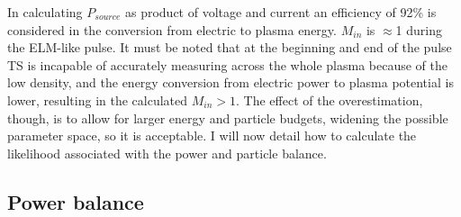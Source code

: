 In calculating $P_{source}$ as product of voltage and current an efficiency of 92\% is considered in the conversion from electric to plasma energy.\cite{Morgan2014} $M_{in}$ is $\approx$1 during the ELM-like pulse. It must be noted that at the beginning and end of the pulse TS is incapable of accurately measuring across the whole plasma because of the low density, and the energy conversion from electric power to plasma potential is lower, resulting in the calculated $M_{in}>1$. The effect of the overestimation, though, is to allow for larger energy and particle budgets, widening the possible parameter space, so it is acceptable.
I will now detail how to calculate the likelihood associated with the power and particle balance.

\subsection{Power balance}\label{Power balance}


